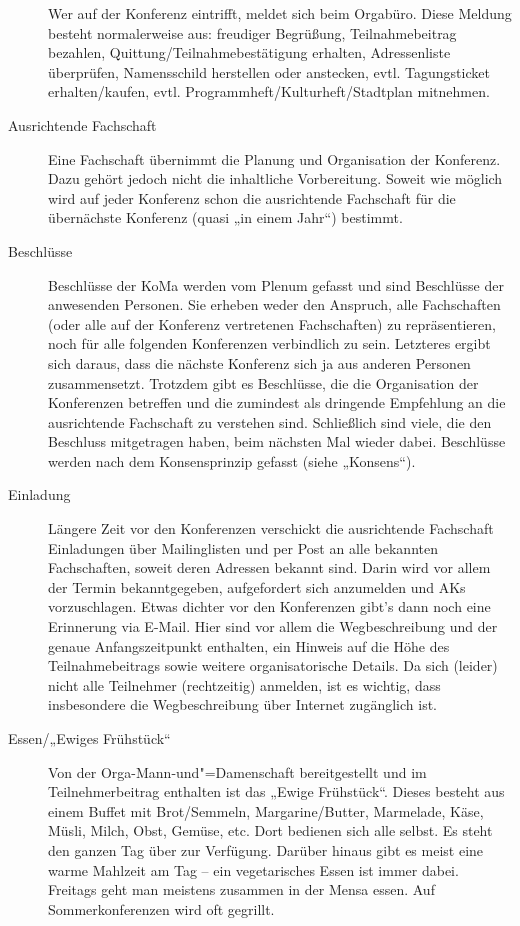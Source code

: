 \begin{description}
	Wer auf der Konferenz eintrifft, meldet sich beim Orgabüro.  Diese Meldung
	besteht normalerweise aus: freudiger Begrüßung, Teilnahmebeitrag bezahlen,
	Quittung/Teilnahmebestätigung erhalten, Adressenliste überprüfen, Namensschild
	herstellen oder anstecken, evtl. Tagungsticket erhalten/kaufen, evtl.
	Programmheft/Kulturheft/Stadtplan mitnehmen.

\item[Ausrichtende Fachschaft] Eine Fachschaft übernimmt die Planung und
	Organisation der Konferenz. Dazu gehört jedoch nicht die inhaltliche
	Vorbereitung. Soweit wie möglich wird auf jeder Konferenz schon die
	ausrichtende Fachschaft für die übernächste Konferenz (quasi „in einem
	Jahr“) bestimmt.

\item[Beschlüsse] Beschlüsse der KoMa werden vom Plenum gefasst und sind
	Beschlüsse der anwesenden Personen. Sie erheben weder den Anspruch, alle
	Fachschaften (oder alle auf der Konferenz vertretenen Fachschaften) zu
	repräsentieren, noch für alle folgenden Konferenzen verbindlich zu sein.
	Letzteres ergibt sich daraus, dass die nächste Konferenz sich ja aus
	anderen Personen zusammensetzt. Trotzdem gibt es Beschlüsse, die die
	Organisation der Konferenzen betreffen und die zumindest als dringende
	Empfehlung an die ausrichtende Fachschaft zu verstehen sind. Schließlich
	sind viele, die den Beschluss mitgetragen haben, beim nächsten Mal wieder
	dabei. Beschlüsse werden nach dem Konsensprinzip gefasst (siehe „Konsens“).

\item[Einladung] Längere Zeit vor den Konferenzen verschickt die ausrichtende
	Fachschaft Einladungen über Mailinglisten und per Post an alle bekannten
	Fachschaften, soweit deren Adressen bekannt sind. Darin wird vor allem der
	Termin bekanntgegeben, aufgefordert sich anzumelden und AKs vorzuschlagen.
	Etwas dichter vor den Konferenzen gibt’s dann noch eine Erinnerung via
	E-Mail. Hier sind vor allem die Wegbeschreibung und der genaue
	Anfangszeitpunkt enthalten, ein Hinweis auf die Höhe des Teilnahmebeitrags
	sowie weitere organisatorische Details. Da sich (leider) nicht alle
	Teilnehmer (rechtzeitig) anmelden, ist es wichtig, dass insbesondere die
	Wegbeschreibung über Internet zugänglich ist.

\item[Essen/„Ewiges Frühstück“] Von der Orga-Mann-und"=Damenschaft
	bereitgestellt und im Teilnehmerbeitrag enthalten ist das „Ewige
	Frühstück“. Dieses besteht aus einem Buffet mit Brot/Semmeln,
	Margarine/Butter, Marmelade, Käse, Müsli, Milch, Obst, Gemüse, etc. Dort
	bedienen sich alle selbst. Es steht den ganzen Tag über zur Verfügung.
	Darüber hinaus gibt es meist eine warme Mahlzeit am Tag – ein vegetarisches
	Essen ist immer dabei. Freitags geht man meistens zusammen in der Mensa
	essen. Auf Sommerkonferenzen wird oft gegrillt.


\end{description}

